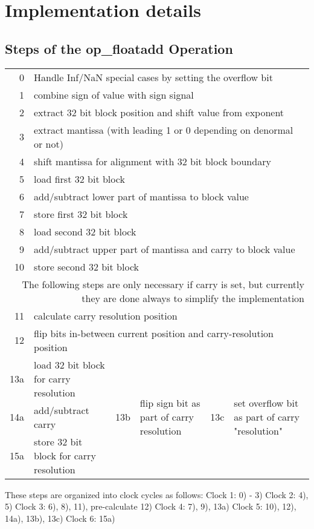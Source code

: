 \section{Implementation details}
\subsection{Steps of the op\_floatadd Operation}

\renewcommand\tabline[2]{#1 & \multicolumn{5}{p{0.75\textwidth}|}{#2}\\}
\begin{tabular}{|r|p{}|r|p{}|r|p{}|}
\hline
\tabline {  0} {Handle Inf/NaN special cases by setting the overflow bit}
\tabline {  1} {combine sign of value with sign signal}
\tabline {  2} {extract 32 bit block position and shift value from exponent}
\tabline {  3} {extract mantissa (with leading 1 or 0 depending on denormal or not)}
\tabline {  4} {shift mantissa for alignment with 32 bit block boundary}
\tabline {  5} {load first 32 bit block}
\tabline {  6} {add/subtract lower part of mantissa to block value}
\tabline {  7} {store first 32 bit block}
\tabline {  8} {load second 32 bit block}
\tabline {  9} {add/subtract upper part of mantissa and carry to block value}
\tabline { 10} {store second 32 bit block}
\hline\hline
\multicolumn{6}{|p{0.75\textwidth}|}{
    The following steps are only necessary if carry is set,
    but currently they are done always to simplify the implementation}\\
\hline\hline
\tabline { 11} {calculate carry resolution position}
\tabline { 12} {flip bits in-between current position and carry-resolution position}
\hline
13a & load 32 bit block for carry resolution &
\multirow{3}{*}{13b} & \multirow{3}{0.25\textwidth}{flip sign bit as part of carry resolution} &
\multirow{3}{*}{13c} & \multirow{3}{0.25\textwidth}{set overflow bit as part of carry "resolution"}\\
14a & add/subtract carry & & & &\\
15a & store 32 bit block for carry resolution & & & &\\
\hline
\end{tabular}

These steps are organized into clock cycles as follows:
Clock 1: 0) - 3)
Clock 2: 4), 5)
Clock 3: 6), 8), 11), pre-calculate 12)
Clock 4: 7), 9), 13a)
Clock 5: 10), 12), 14a), 13b), 13c)
Clock 6: 15a)


